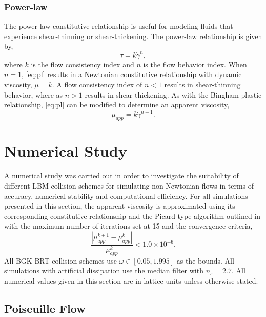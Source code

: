 \documentclass[pdftex,ms]{pittetd}
\begin{document}
\subsubsection{Power-law}

The power-law constitutive relationship is useful for modeling fluids that experience shear-thinning or shear-thickening.
The power-law relationship is given by,
\begin{equation} \label{eq:pl}
\tau = k \dot{\gamma}^n,
\end{equation}
\noindent where $k$ is the flow consistency index and $n$ is the flow behavior index.
When $n = 1$, \eqref{eq:pl} results in a Newtonian constitutive relationship with dynamic viscosity, $\mu = k$.
A flow consistency index of $n < 1$ results in shear-thinning behavior, where as $n > 1$ results in shear-thickening.
As with the Bingham plastic relationship, \eqref{eq:pl} can be modified to determine an apparent viscosity,
\begin{equation} \label{eq:pl-mu-app}
\mu_{app} = k \dot{\gamma}^{n-1}.
\end{equation}

\section{Numerical Study}

A numerical study was carried out in order to investigate the suitability of different LBM collision schemes for simulating non-Newtonian flows in terms of accuracy, numerical stability and computational efficiency.
For all simulations presented in this section, the apparent viscosity is approximated using its corresponding constitutive relationship and the Picard-type algorithm outlined in  with the maximum number of iterations set at 15 and the convergence criteria,
\begin{equation} \label{eq:mu-app-conv}
\frac{\left|\mu_{app}^{k+1} - \mu_{app}^{k}\right|}{\mu_{app}^{k}} < 1.0 \times 10^{-6}.
\end{equation}
All BGK-BRT collision schemes use $\omega \in [0.05, 1.995]$ as the bounds.
All simulations with artificial dissipation use the median filter with $n_s = 2.7$.
All numerical values given in this section are in lattice units unless otherwise stated.

\newcommand{\pgrad}{\frac{\partial p}{\partial x}}

\subsection{Poiseuille Flow}
\end{document}
